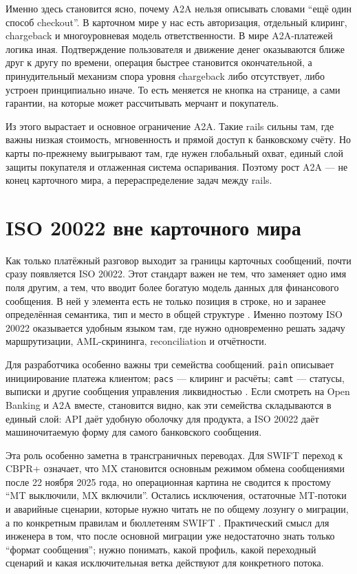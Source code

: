 Именно здесь становится ясно, почему A2A нельзя описывать словами
\enquote{ещё один способ checkout}. В карточном мире у нас есть
авторизация, отдельный клиринг, chargeback и многоуровневая модель
ответственности. В мире A2A-платежей логика иная. Подтверждение пользователя
и движение денег оказываются ближе друг к другу по времени, операция
быстрее становится окончательной, а принудительный механизм спора
уровня chargeback либо отсутствует, либо устроен принципиально иначе.
То есть меняется не кнопка на странице, а сами гарантии, на которые
может рассчитывать мерчант и покупатель.

Из этого вырастает и основное ограничение A2A. Такие rails сильны там,
где важны низкая стоимость, мгновенность и прямой доступ к банковскому
счёту. Но карты по-прежнему выигрывают там, где нужен глобальный
охват, единый слой защиты покупателя и отлаженная система
оспаривания. Поэтому рост A2A — не конец карточного мира,
а перераспределение задач между rails.

\section{ISO 20022 вне карточного мира}
\label{sec:iso20022}

Как только платёжный разговор выходит за границы карточных сообщений,
почти сразу появляется ISO 20022. Этот стандарт важен не тем, что
заменяет одно имя поля другим, а тем, что вводит более богатую модель
данных для финансового сообщения. В ней у элемента есть не только
позиция в строке, но и заранее определённая семантика, тип
и место в общей структуре . Именно поэтому
ISO 20022 оказывается удобным языком там, где нужно одновременно
решать задачу маршрутизации, AML-скрининга, reconciliation
и отчётности.

Для разработчика особенно важны три семейства сообщений. \texttt{pain}
описывает инициирование платежа клиентом; \texttt{pacs} — клиринг
и расчёты; \texttt{camt} — статусы, выписки и другие сообщения
управления ликвидностью . Если смотреть
на Open Banking и A2A вместе, становится видно, как эти семейства
складываются в единый слой: API даёт удобную оболочку для продукта,
а ISO 20022 даёт машиночитаемую форму для самого банковского
сообщения.

Эта роль особенно заметна в трансграничных переводах. Для SWIFT
переход к CBPR+ означает, что MX становится основным режимом обмена
сообщениями после 22 ноября 2025 года, но операционная картина не сводится
к простому \enquote{MT выключили, MX включили}. Остались исключения,
остаточные MT-потоки и аварийные сценарии, которые нужно читать
не по общему лозунгу о миграции, а по конкретным правилам и бюллетеням
SWIFT . Практический смысл для инженера в том, что после
основной миграции уже недостаточно знать только \enquote{формат
  сообщения}; нужно понимать, какой профиль, какой переходный сценарий
и какая исключительная ветка действуют для конкретного потока.

